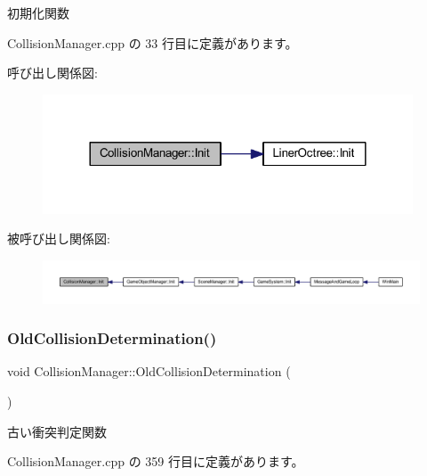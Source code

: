 初期化関数 



 Collision\+Manager.\+cpp の 33 行目に定義があります。

呼び出し関係図\+:\nopagebreak
\begin{figure}[H]
\begin{center}
\leavevmode
\includegraphics[width=312pt]{class_collision_manager_a2c5770b90b7a46a5674df008a7a57145_cgraph}
\end{center}
\end{figure}
被呼び出し関係図\+:
\nopagebreak
\begin{figure}[H]
\begin{center}
\leavevmode
\includegraphics[width=350pt]{class_collision_manager_a2c5770b90b7a46a5674df008a7a57145_icgraph}
\end{center}
\end{figure}
\mbox{\label{class_collision_manager_a25dbc14dbc709a6bc2dc4424e3965dbe}} 
\subsubsection{\texorpdfstring{Old\+Collision\+Determination()}{OldCollisionDetermination()}}
{\footnotesize\ttfamily void Collision\+Manager\+::\+Old\+Collision\+Determination (\begin{DoxyParamCaption}{ }\end{DoxyParamCaption})\hspace{0.3cm}{\ttfamily [private]}}



古い衝突判定関数 



 Collision\+Manager.\+cpp の 359 行目に定義があります。

